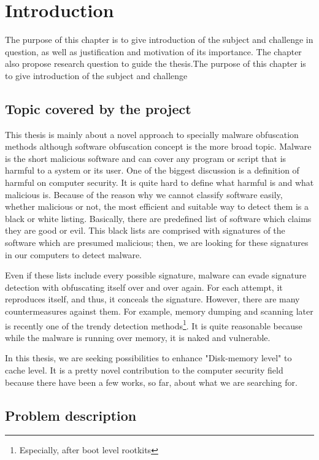 \chapter{Introduction}
The purpose of this chapter is to give introduction of the subject and challenge in question, as well as justification and motivation of its importance. The chapter also propose research question to guide the thesis.The purpose of this chapter is to give introduction of the subject and challenge

\section{Topic covered by the project}
This thesis is mainly about a novel approach to specially malware obfuscation methods although software obfuscation concept is the more broad topic. Malware is the short malicious software and can cover any program or script that is harmful to a system or its user. One of the biggest discussion is a definition of harmful on computer security. It is quite hard to define what harmful is and what malicious is. Because of the reason why we cannot classify software easily, whether malicious or not, the most efficient and suitable way to detect them is a black or white listing. Basically, there are predefined list of software which claims they are good or evil. This black lists are comprised with signatures of the software which are presumed malicious; then, we are looking for these signatures in our computers to detect malware. 

Even if these lists include every possible signature, malware can evade signature detection with obfuscating itself over and over again. For each attempt, it reproduces itself, and thus, it conceals the signature. However, there are many countermeasures against them\cite{moser2007limits}\cite{egele2012survey}. For example, memory dumping and scanning later is recently one of the trendy detection methods\footnote{Especially, after boot level rootkits}. It is quite reasonable because while the malware is running over memory, it is naked and vulnerable.

In this thesis, we are seeking possibilities to enhance "Disk-memory level" to cache level. It is a pretty novel contribution to the computer security field because there have been a few works, so far, about what we are searching for.


\section{Problem description}

